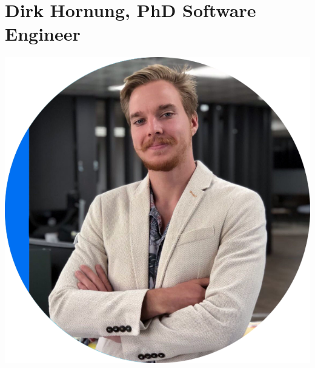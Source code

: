 \documentclass[11pt]{article}
\begin{document}
\begin{minipage}[t]{0.25\textwidth}
  \section*{Dirk Hornung, PhD Software Engineer}


  \vspace{0.8cm}

  \includegraphics[width=\linewidth]{dirkRound.png}

  \vspace{1.1cm}

  \begin{footnotesize}
  \end{footnotesize}

  \vspace{0.5cm}


\end{minipage}
\end{document}
